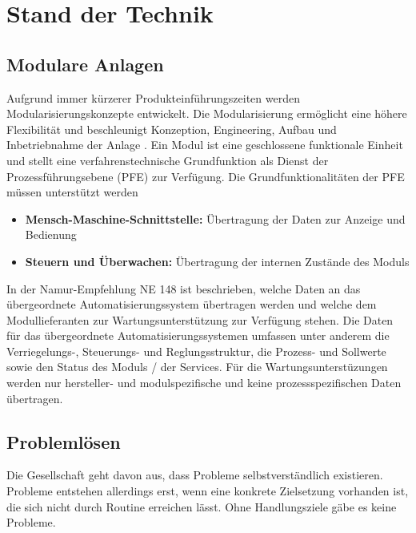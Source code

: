 
\chapter{Stand der Technik}
\label{sec:StandDerTechnik}


\section{Modulare Anlagen}
Aufgrund immer kürzerer Produkteinführungszeiten werden Modularisierungskonzepte entwickelt. Die Modularisierung ermöglicht eine höhere Flexibilität und beschleunigt Konzeption, Engineering, Aufbau und Inbetriebnahme der Anlage \cite{Urbas2012}. Ein Modul ist eine geschlossene funktionale Einheit und stellt eine verfahrenstechnische Grundfunktion als Dienst der Prozessführungsebene (PFE) zur Verfügung. Die Grundfunktionalitäten der PFE müssen unterstützt werden \cite{Bernshausen2016}
\begin{itemize}
\item \textbf{Mensch-Maschine-Schnittstelle:} Übertragung der Daten zur Anzeige und Bedienung
\item \textbf{Steuern und Überwachen:} Übertragung der internen Zustände des Moduls
\end{itemize}

In der Namur-Empfehlung NE 148 \cite{NAMURArbeitskreis1.122013} ist beschrieben, welche Daten an das übergeordnete Automatisierungssystem übertragen werden und welche dem Modullieferanten zur Wartungsunterstützung zur Verfügung stehen. Die Daten für das übergeordnete Automatisierungssystemen umfassen unter anderem die Verriegelungs-, Steuerungs- und Reglungsstruktur, die Prozess- und Sollwerte sowie den Status des Moduls / der Services. Für die Wartungsunterstüzungen werden nur hersteller- und modulspezifische und keine prozessspezifischen Daten übertragen.


\section{Problemlösen}
Die Gesellschaft geht davon aus, dass Probleme selbstverständlich existieren. Probleme entstehen allerdings erst, wenn eine konkrete Zielsetzung vorhanden ist, die sich nicht durch Routine erreichen lässt. Ohne Handlungsziele gäbe es keine Probleme. \cite{Funke2015, Betsch2011,  Dorner1984}

